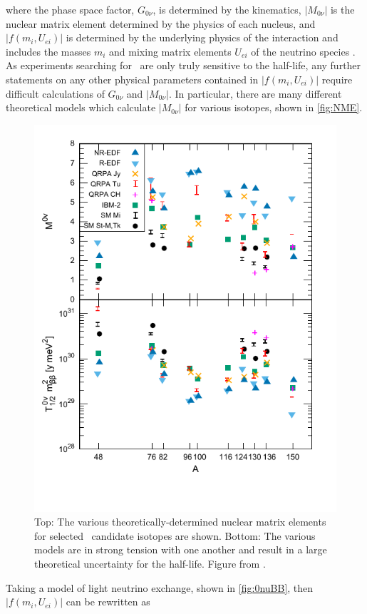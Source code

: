 where the phase space factor, $G_{0\nu}$, is determined by the kinematics, $|M_{0\nu}|$ is the nuclear matrix element determined by the physics of each nucleus, and $|f(m_i, U_{ei})|$ is determined by the underlying physics of the interaction and includes the masses $m_i$ and mixing matrix elements $U_{ei}$ of the neutrino species \cite{Barea:2013bz}.
As experiments searching for \zeronubb~are only truly sensitive to the half-life, any further statements on any other physical parameters contained in $|f(m_i, U_{ei})|$ require difficult calculations of $G_{0\nu}$ and $|M_{0\nu}|$.
In particular, there are many different theoretical models which calculate $|M_{0\nu}|$ for various isotopes, shown in \autoref{fig:NME}.
\begin{figure}[htbp]
    \centering
    \includegraphics[width=0.8\linewidth]{Figures/NMEversusA.pdf}
    \caption[The various theoretically-determined nuclear matrix elements for selected \zeronubb~candidate isotopes.]
    {Top: The various theoretically-determined nuclear matrix elements for selected \zeronubb~candidate isotopes are shown.
    Bottom: The various models are in strong tension with one another and result in a large theoretical uncertainty for the half-life. Figure from \cite{Engel:NME}.}
    \label{fig:NME}
\end{figure}
Taking a model of light neutrino exchange, shown in \autoref{fig:0nuBB}, then $|f(m_i, U_{ei})|$ can be rewritten as
